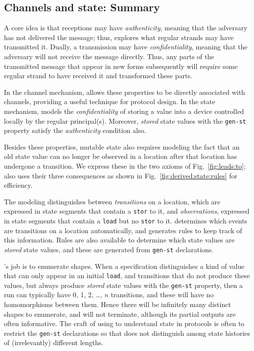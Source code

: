 \subsection{Channels and state:  Summary}
\label{sec:channels:state:summary}

A core idea is that receptions may have \emph{authenticity}, meaning
that the adversary has not delivered the message; thus, {\cpsa}
explores what regular strands may have transmitted it.  Dually, a
transmission may have \emph{confidentiality}, meaning that the
adversary will not receive the message directly.  Thus, any parts of
the transmitted message that appear in new forms subsequently will
require some regular strand to have received it and transformed these
parts.

In the {channel} mechanism, {\cpsa} allows these properties to be
directly associated with channels, providing a useful technique for
protocol design.  In the state mechanism, {\cpsa} models the
\emph{confidentiality} of storing a value into a device controlled
locally by the regular principal(s).  Moreover, \emph{stored} state
values with the \texttt{gen-st} property satisfy the
\emph{authenticity} condition also.

Besides these properties, mutable state also requires modeling the
fact that an old state value can no longer be observed in a location
after that location has undergone a transition.  We express these in
the two axioms of Fig.~\ref{fig:leads:to}; {\cpsa} also uses their
three consequences as shown in Fig.~\ref{fig:derived:state:rules} for
efficiency.

The modeling distinguishes between \emph{transitions} on a location,
which are expressed in state segments that contain a \verb|stor| to
it, and \emph{observations}, expressed in state segments that contain
a \verb|load| but no \verb|stor| to it.  {\cpsa} determines which
events are transitions on a location automatically, and generates
rules to keep track of this information.  Rules are also available to
determine which state values are \emph{stored} state values, and these
are generated from \texttt{gen-st} declarations.

{\cpsa}'s job is to enumerate shapes.  When a specification
distinguishes a kind of value that can only appear in an initial
\verb|load|, and transitions that do not produce these values, but
always produce \emph{stored} state values with the \texttt{gen-st}
property, then a run can typically have 0, 1, 2, \dots, $n$
transitions, and these will have no homomorphisms between them.  Hence
there will be infinitely many distinct shapes to enumerate, and
{\cpsa} will not terminate, although its partial outputs are often
informative.  The craft of using {\cpsa} to understand state in
protocols is often to restrict the \texttt{gen-st} declarations so
that {\cpsa} does not distinguish among state histories of
(irrelevantly) different lengths.


